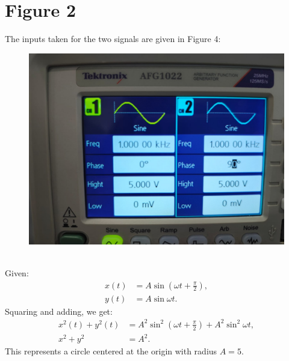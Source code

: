 \documentclass[a4paper,12pt]{article}
\numberwithin{equation}{section} %
\begin{document}
\section{Figure 2}
The inputs taken for the two signals are given in Figure 4:
\begin{figure}[h!]
    \centering
    \includegraphics[width=0.5\linewidth]{Tables/Table2.jpeg} 
    \caption{}
\end{figure}\\
\noindent Given:
\begin{align}
    x(t) &= A \sin (\omega t+\frac{\pi}{2}), \\
    y(t) &= A \sin \omega t.
\end{align}
Squaring and adding, we get:
\begin{align}
    x^2(t) + y^2(t) &= A^2 \sin^2 (\omega t +\frac{\pi}{2})+ A^2 \sin^2 \omega t, \\
    x^2 + y^2 &= A^2.
\end{align}
This represents a circle centered at the origin with radius $A=5$.
\end{document}
